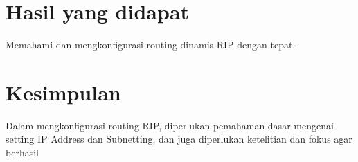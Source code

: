 \section{Hasil yang didapat}
Memahami dan mengkonfigurasi routing dinamis RIP dengan tepat.

\section{Kesimpulan}
Dalam mengkonfigurasi routing RIP, diperlukan pemahaman dasar mengenai setting IP Address dan Subnetting, dan juga diperlukan ketelitian dan fokus agar berhasil



